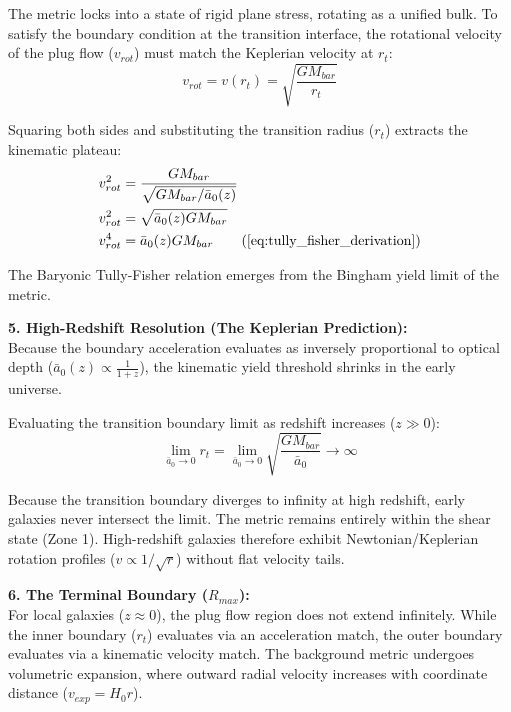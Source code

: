The metric locks into a state of rigid plane stress, rotating as a unified bulk. To satisfy the boundary condition at the transition interface, the rotational velocity of the plug flow ($v_{rot}$) must match the Keplerian velocity at $r_t$:
\begin{equation}
    v_{rot} = v(r_t) = \sqrt{\frac{G M_{bar}}{r_t}} 
\end{equation}

Squaring both sides and substituting the transition radius ($r_t$) extracts the kinematic plateau: 
\begin{align}
    v_{rot}^2 &= \frac{G M_{bar}}{\sqrt{G M_{bar} / \bar{a}_0(z)}} \nonumber \\
    v_{rot}^2 &= \sqrt{\bar{a}_0(z) G M_{bar}} \nonumber \\
    v_{rot}^4 &= \bar{a}_0(z) G M_{bar} \tag{\ref{eq:tully_fisher_derivation}}
\end{align}

The Baryonic Tully-Fisher relation emerges from the Bingham yield limit of the metric. 

\vspace{0.2 cm}

\textbf{5. High-Redshift Resolution (The Keplerian Prediction):} \\
Because the boundary acceleration evaluates as inversely proportional to optical depth ($\bar{a}_0(z) \propto \frac{1}{1+z}$), the kinematic yield threshold shrinks in the early universe.

Evaluating the transition boundary limit as redshift increases ($z \gg 0$):
\begin{equation}
    \lim_{\bar{a}_0 \to 0} r_t = \lim_{\bar{a}_0 \to 0} \sqrt{\frac{G M_{bar}}{\bar{a}_0}} \to \infty \label{eq:high_z_limit}
\end{equation}

Because the transition boundary diverges to infinity at high redshift, early galaxies never intersect the limit. The metric remains entirely within the shear state (Zone 1). High-redshift galaxies therefore exhibit Newtonian/Keplerian rotation profiles ($v \propto 1/\sqrt{r}$) without flat velocity tails.

\vspace{0.2 cm}

\textbf{6. The Terminal Boundary ($R_{max}$):} \\
For local galaxies ($z \approx 0$), the plug flow region does not extend infinitely. While the inner boundary ($r_t$) evaluates via an acceleration match, the outer boundary evaluates via a kinematic velocity match. The background metric undergoes volumetric expansion, where outward radial velocity increases with coordinate distance ($v_{exp} = H_0 r$).

